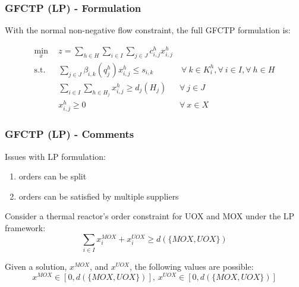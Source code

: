 \begin{frame}[ctb!]
  \frametitle{GFCTP (LP) - Formulation} 

  With the normal non-negative flow constraint, the full GFCTP formulation is:
  
  \begin{subequations}\label{eqs:GFCTP-LP}
    \begin{align}
      \min_{x} \:\: & 
      z = \sum_{h \in H}\sum_{i \in I}\sum_{j \in J}c_{i,j}^{h} x_{i,j}^{h} 
      & \label{eqs:GFCTP-LP_obj} \\
      \text{s.t.} \:\: &
      \sum_{j \in J}\beta_{i,k}(q_{j}^{h}) x_{i,j}^{h} \leq s_{i,k} 
      &
      \: \forall \: k \in K_{i}^{h},  
      \forall \: i \in I, \forall \: h \in H \label{eqs:GFCTP-LP_sup} \\
      &
      \sum_{i \in I}\sum_{h \in H_{j}} x_{i,j}^{h} \geq d_{j}(H_{j}) 
      & 
      \forall \: j \in J \label{eqs:GFCTP-LP_dem} \\
      &
      x^h_{i,j} \geq 0
      &
      \forall \: x \in X \label{eqs:GFCTP-LP_x}
    \end{align}
  \end{subequations}
\end{frame}

\begin{frame}[ctb!]
  \frametitle{GFCTP (LP) - Comments} 
  
  Issues with LP formulation:
  \begin{enumerate}
    \item orders can be split
    \item orders can be satisfied by multiple suppliers
  \end{enumerate}

  Consider a thermal reactor's order constraint for UOX and MOX under the LP
  framework:
  \begin{equation}
    \sum_{i \in I} x_{i}^{MOX} + x_{i}^{UOX} \geq d(\{MOX,UOX\})
  \end{equation} 

  Given a solution, $x^{MOX}$, and $x^{UOX}$, the following values are possible:
  \begin{equation}
    x^{MOX} \in [0, d(\{MOX,UOX\})], \: x^{UOX} \in [0, d(\{MOX,UOX\})]
  \end{equation} 

\end{frame}

